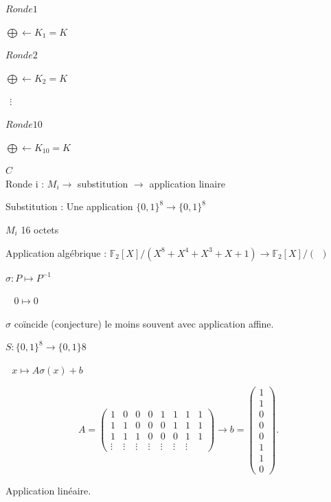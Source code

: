 \documentclass[12pt,a4paper]{article}
\begin{document}
$Ronde 1 $

$\bigoplus \longleftarrow K_1 = K$

$Ronde 2$

$\bigoplus \longleftarrow K_2 = K$

$\ \ \vdots$

$Ronde 10$

$\bigoplus \longleftarrow K_{10} = K$

$ C $\\

Ronde i : $M_i \longrightarrow  $ substitution $ \longrightarrow $ application linaire

Substitution : Une application $\{0,1\}^8 \rightarrow \{0,1\}^8$

$M_i$ 16 octets

Application algébrique : $\mathbb{F}_2 [X] / (X^8+X^4+X^3+X+1) \rightarrow \mathbb{F}_2 [X] / ( \ \ )$

$\sigma : P \mapsto P^{-1}$

$\ \ \ \ 0 \mapsto 0$

$\sigma$ coïncide (conjecture) le moins souvent avec application affine.



$S:\{0,1\}^8 \longrightarrow \{0,1\}8$

$\ \ \ x \longmapsto A \sigma (x) +b$

\begin{displaymath}
A = 
\begin{pmatrix}
1 & 0 & 0  & 0 & 1 & 1 & 1 & 1 \\ 
1 & 1 & 0 & 0 & 0 & 1 & 1 & 1 \\ 
1 & 1 & 1  & 0 & 0 & 0 & 1 & 1 \\ 
\vdots & \vdots & \vdots & \vdots & \vdots & \vdots & \vdots & 
\end{pmatrix} 
\longrightarrow b = 
\begin{pmatrix}
1 \\ 
1 \\ 
0 \\ 
0 \\ 
0 \\ 
1 \\ 
1 \\ 
0
\end{pmatrix} .
\end{displaymath}

Application linéaire.
\end{document}
